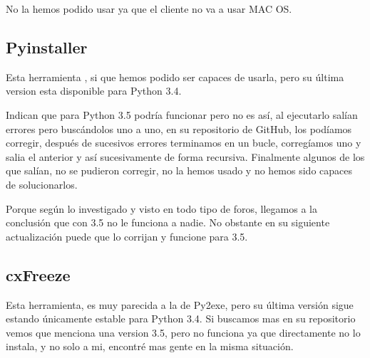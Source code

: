 No la hemos podido usar ya que el cliente no va a usar MAC OS.

\subsection{Pyinstaller}
Esta herramienta \cite{Pyinstaller}, si que hemos podido ser capaces de usarla, pero su última version esta disponible para Python 3.4.

Indican que para Python 3.5 podría funcionar pero no es así,
al ejecutarlo salían errores pero buscándolos uno a uno, en su repositorio de GitHub, los podíamos corregir, después de sucesivos errores terminamos en un bucle, corregíamos uno y salia el anterior y así sucesivamente de forma recursiva. 
Finalmente algunos de los que salían, no se pudieron corregir, 
no la hemos usado y no hemos sido capaces de solucionarlos.

Porque según lo investigado y visto en todo tipo de foros, llegamos a la conclusión que con 3.5 no le funciona a nadie.
No obstante en su siguiente actualización puede que lo corrijan y funcione para 3.5.

\subsection{cxFreeze}
Esta herramienta, es muy parecida a la de Py2exe, pero su última versión sigue estando únicamente estable para Python 3.4. 
Si buscamos mas en su repositorio vemos que menciona una version 3.5, pero no funciona ya que directamente no lo instala, y no solo a mi, encontré mas gente en la misma situación.



